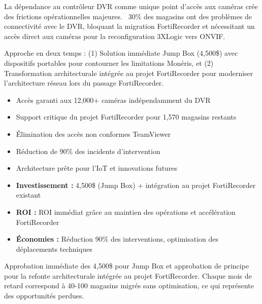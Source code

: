 \documentclass{UTT-Books-44}
\begin{document}
\maketitle

\tableofcontents
\clearpage

\begin{executivesummaryenv}
La dépendance au contrôleur DVR comme unique point d'accès aux caméras crée des frictions opérationnelles majeures. ~30\% des magasins ont des problèmes de connectivité avec le DVR, bloquant la migration FortiRecorder et nécessitant un accès direct aux caméras pour la reconfiguration 3XLogic vers ONVIF.

Approche en deux temps : (1) Solution immédiate Jump Box (4,500\$) avec dispositifs portables pour contourner les limitations Monéris, et (2) Transformation architecturale intégrée au projet FortiRecorder pour moderniser l'architecture réseau lors du passage FortiRecorder.

\begin{itemize}
\item Accès garanti aux 12,000+ caméras indépendamment du DVR
\item Support critique du projet FortiRecorder pour 1,570 magasins restants
\item Élimination des accès non conformes TeamViewer
\item Réduction de 90\% des incidents d'intervention
\item Architecture prête pour l'IoT et innovations futures
\end{itemize}

\begin{itemize}
\item \textbf{Investissement :} 4,500\$ (Jump Box) + intégration au projet FortiRecorder existant
\item \textbf{ROI :} ROI immédiat grâce au maintien des opérations et accélération FortiRecorder
\item \textbf{Économies :} Réduction 90\% des interventions, optimisation des déplacements techniques
\end{itemize}

Approbation immédiate des 4,500\$ pour Jump Box et approbation de principe pour la refonte architecturale intégrée au projet FortiRecorder. Chaque mois de retard correspond à 40-100 magasins migrés sans optimisation, ce qui représente des opportunités perdues.
\end{executivesummaryenv}
\end{document}
